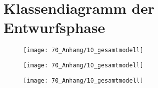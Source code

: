\section{Klassendiagramm der Entwurfsphase}
\label{sec:anhang-klassendiagramm}

\newcommand{\height}{16cm}

\begin{figure}
     \centering
     \texttt{[image: 70\_Anhang/10\_gesamtmodell]}
\end{figure}

\begin{figure}
     \centering
     \texttt{[image: 70\_Anhang/10\_gesamtmodell]}
\end{figure}

\begin{figure}
     \centering
     \texttt{[image: 70\_Anhang/10\_gesamtmodell]}
\end{figure}